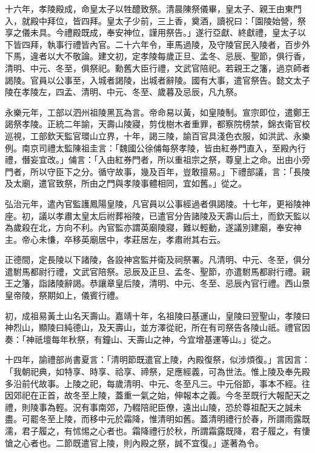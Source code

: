 十六年，孝陵殿成，命皇太子以牲醴致祭。清晨陳祭儀畢，皇太子、親王由東門入，就殿中拜位，皆四拜。皇太子少前，三上香，奠酒，讀祝曰：「園陵始營，祭享之儀未具。今禮殿既成，奉安神位，謹用祭告。」遂行亞獻、終獻禮，皇太子以下皆四拜，執事行禮皆內官。二十六年令，車馬過陵，及守陵官民入陵者，百步外下馬，違者以大不敬論。建文初，定孝陵每歲正旦、孟冬、忌辰、聖節，俱行香，清明、中元、冬至，俱祭祀。勳舊大臣行禮，文武官陪祀。若親王之籓，過京師者謁陵。官員以公事至，入城者謁陵，出城者辭陵。國有大事，遣官祭告。懿文太子陵在孝陵左，四孟、清明、中元、冬至、歲暮及忌辰，凡九祭。

永樂元年，工部以泗州祖陵黑瓦為言。帝命易以黃，如皇陵制。宣宗即位，遣鄭王謁祭孝陵。正統二年諭，天壽山陵寢，剪伐樹木者重罪，都察院榜禁，錦衣衛官校巡視，工部欽天監官環山立界，十年，謁三陵，諭百官具淺色衣服，如洪武、永樂例。南京司禮太監陳祖圭言：「魏國公徐俌每祭孝陵，皆由紅券門直入，至殿內行禮，僭妄宜改。」俌言：「入由紅券門者，所以重祖宗之祭，尊皇上之命。出由小旁門者，所以守臣下之分。循守故事，幾及百年，豈敢擅易。」下禮部議，言：「長陵及太廟，遣官致祭，所由之門與孝陵事體相同，宜如舊。」從之。

弘治元年，遣內官監護鳳陽皇陵，凡官員以公事經過者俱謁陵。十七年，更裕陵神座。初，議以孝肅太皇太后祔葬裕陵，已遣官分告諸陵及天壽山后土，而欽天監以為歲殺在北，方向不利。內官監亦謂英廟陵寢，難以輕動，遂議別建廟，奉安神主。帝心未慊，卒移英廟居中，孝莊居左，孝肅祔其右云。

正德間，定長陵以下諸陵，各設神宮監并衛及祠祭署。凡清明、中元、冬至，俱分遣駙馬都尉行禮，文武官陪祭。忌辰及正旦、孟冬、聖節，亦遣駙馬都尉行禮。親王之籓，詣諸陵辭謁。恭讓章皇后陵，清明、中元、冬至、忌辰內官行禮。西山景皇帝陵，祭期如上，儀賓行禮。

初，成祖易黃土山名天壽山。嘉靖十年，名祖陵曰基運山，皇陵曰翌聖山，孝陵曰神烈山，顯陵曰純德山，及天壽山，並方澤從祀，所在有司祭告各陵山祇。禮官因奏：「神祇壇每年秋祭，有鐘山、天壽山之神，今宜增基運等山。」從之。

十四年，諭禮部尚書夏言：「清明節既遣官上陵，內殿復祭，似涉煩復。」言因言：「我朝祀典，如特享、時享、祫享、禘祭，足應經義，可為世法。惟上陵及奉先殿多沿前代故事。上陵之祀，每歲清明、中元、冬至凡三。中元俗節，事本不經。往因郊祀在正首，故冬至上陵，蓋重一氣之始，伸報本之義。今冬至既行大報配天之禮，則陵事為輕。況有事南郊，乃輟陪祀臣僚，遠出山陵，恐於尊祖配天之誠未盡。可罷冬至上陵，而移中元於霜降，惟清明如舊。蓋清明禮行於春，所謂雨露既濡，君子履之，有怵惕之心者也。霜降禮行於秋，所謂霜露既降，君子履之，有悽愴之心者也。二節既遣官上陵，則內殿之祭，誠不宜復。」遂著為令。

